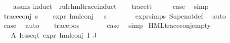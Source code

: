 \begin{isabellebody}
%
\isadelimproof
\ \ %
\endisadelimproof
%
\isatagproof
{}\isamarkupfalse%
\ assms\isanewline
{}\isamarkupfalse%
{\isacharparenleft}{\kern0pt}induct\ {\isasymphi}\ rule{\isacharcolon}{\kern0pt}hml{\isacharunderscore}{\kern0pt}trace{\isachardot}{\kern0pt}induct{\isacharparenright}{\kern0pt}\isanewline
\ \ \isamarkupfalse%
\ trace{\isacharunderscore}{\kern0pt}tt\isanewline
\ \ \isamarkupfalse%
\ \isamarkupfalse%
\ {\isacharquery}{\kern0pt}case\ \isamarkupfalse%
\ simp\isanewline
{}\isamarkupfalse%
\isanewline
\ \ \isamarkupfalse%
\ {\isacharparenleft}{\kern0pt}trace{\isacharunderscore}{\kern0pt}conj\ {\isasympsi}s{\isacharparenright}{\kern0pt}\isanewline
\ \ \isamarkupfalse%
\ {\isachardoublequoteopen}{\isacharparenleft}{\kern0pt}expr{\isacharunderscore}{\kern0pt}{}\ {\isacharparenleft}{\kern0pt}hml{\isacharunderscore}{\kern0pt}conj\ {\isacharbraceleft}{\kern0pt}{\isacharbraceright}{\kern0pt}\ {\isacharbraceleft}{\kern0pt}{\isacharbraceright}{\kern0pt}\ {\isasympsi}s{\isacharparenright}{\kern0pt}{\isacharparenright}{\kern0pt}\ {\isacharequal}{\kern0pt}\ {}{\isachardoublequoteclose}\isanewline
\ \ \ \ \isamarkupfalse%
\ expr{\isacharunderscore}{\kern0pt}{}{\isachardot}{\kern0pt}simps\ Sup{\isacharunderscore}{\kern0pt}enat{\isacharunderscore}{\kern0pt}def\ \isamarkupfalse%
\ auto\isanewline
\ \ \isamarkupfalse%
\ \isamarkupfalse%
\ {\isacharquery}{\kern0pt}case\ \isamarkupfalse%
\ auto\isanewline
{}\isamarkupfalse%
\isanewline
\ \ \isamarkupfalse%
\ {\isacharparenleft}{\kern0pt}trace{\isacharunderscore}{\kern0pt}pos\ {\isasymphi}\ {\isasymalpha}{\isacharparenright}{\kern0pt}\isanewline
\ \ \isamarkupfalse%
\ \isamarkupfalse%
\ {\isacharquery}{\kern0pt}case\ \isamarkupfalse%
\ simp\isanewline
{}\isamarkupfalse%
%
\endisatagproof
{\isafoldproof}%
%
\isadelimproof
\isanewline
%
\endisadelimproof
\isanewline
{}\isamarkupfalse%
\ HML{\isacharunderscore}{\kern0pt}trace{\isacharunderscore}{\kern0pt}conj{\isacharunderscore}{\kern0pt}empty{\isacharcolon}{\kern0pt}\isanewline
\ \ \ A{}{\isacharcolon}{\kern0pt}\ {\isachardoublequoteopen}less{\isacharunderscore}{\kern0pt}eq{\isacharunderscore}{\kern0pt}t\ {\isacharparenleft}{\kern0pt}expr\ {\isacharparenleft}{\kern0pt}hml{\isacharunderscore}{\kern0pt}conj\ I\ J\ {\isasymPhi}{\isacharparenright}{\kern0pt}{\isacharparenright}{\kern0pt}\ {\isacharparenleft}{\kern0pt}{\isasyminfinity}{\isacharcomma}{\kern0pt}\ {}{\isacharcomma}{\kern0pt}\ {}{\isacharcomma}{\kern0pt}\ {}{\isacharcomma}{\kern0pt}\ {}{\isacharcomma}{\kern0pt}\ {}{\isacharparenright}{\kern0pt}{\isachardoublequoteclose}\ \isanewline

\end{isabellebody}
